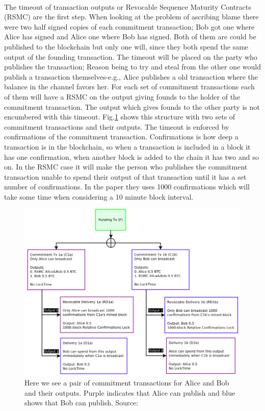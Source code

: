\documentclass[informationsecurity]{gucmasterproject}
\begin{document}
\paragraph{}
The timeout of transaction outputs or Revocable Sequence Maturity Contracts (RSMC) are the first step. When looking at the problem of ascribing blame there were two half signed copies of each commitment transaction; Bob got one where Alice has signed and Alice one where Bob has signed. Both of them are could be published to the blockchain but only one will, since they both spend the same output of the founding transaction. The timeout will be placed on the party who publishes the transaction; Reason being to try and steal from the other one would publish a transaction themselves-e.g., Alice publishes a old transaction where the balance in the channel favors her. For each set of commitment transactions each of them will have a RSMC on the output giving founds to the holder of the commitment transaction. The output which gives founds to the other party is not encumbered with this timeout. Fig.\ref{fig:ln_timeout} shows this structure with two sets of commitment transactions and their outputs. The timeout is enforced by confirmations of the commitment transaction. Confirmations is how deep a transaction is in the blockchain, so when a transaction is included in a block it has one confirmation, when another block is added to the chain it has two and so on\cite{antonopoulos2017mastering}. In the RSMC case it will make the person who publishes the commitment transaction unable to spend their output of that transaction until it has a set number of confirmations. In the paper they uses 1000 confirmations which will take some time when considering a 10 minute block interval.

\begin{figure}[h]
    \centering
    \includegraphics[width=12cm]{figs/ln_timeout.png}
    \caption{Here we see a pair of commitment transactions for Alice and Bob and their outputs. Purple indicates that Alice can publish and blue shows that Bob can publish. Source: \cite{poon2015bitcoin}}
    \label{fig:ln_timeout}
\end{figure}
\end{document}
